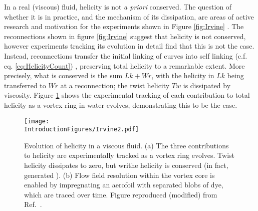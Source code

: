 In a real (viscous) fluid, helicity is not \emph{a priori} conserved. The question of whether it is in practice, and the mechanism of its dissipation, are areas of active research and motivation for the experiments shown in Figure \ref{fig:Irvine} \citep{Kleckner2013}. The reconnections shown in figure \ref{fig:Irvine} suggest that helicity is not conserved, however experiments tracking its evolution in detail \citep{Kleckner2013,Scheeler2014,Scheeler2016} find that this is not the case. Instead, reconnections transfer the initial linking of curves into self linking (c.f. eq. \ref{eq:HelicityCount}) , preserving total helicity to a remarkable extent. More precisely, what is conserved is the sum $Lk +Wr$, with the helicity in $Lk$ being transferred to $Wr$ at a reconnection; the twist helicity $Tw$ is dissipated by viscosity. Figure \ref{fig:Irvine2} shows the experimental tracking of each contribution to total helicity as a vortex ring in water evolves, demonstrating this to be the case.
\begin{figure}[htbp]
\centering
\texttt{[image: \\IntroductionFigures/Irvine2.pdf]}
\caption{Evolution of helicity in a viscous fluid. (a) The three contributions to helicity are experimentally tracked as a vortex ring evolves. Twist helicity dissipates to zero, but writhe helicity is conserved (in fact, generated \citep{Scheeler2016}). (b) Flow field resolution within the vortex core is enabled by impregnating an aerofoil with separated blobs of dye, which are traced over time. Figure reproduced (modified) from Ref.~\cite{Scheeler2016}. }
\label{fig:Irvine2}
\end{figure}

